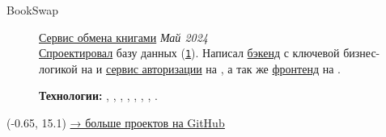 \documentclass[margin,line]{resume}
\begin{document}
\begin{resume}
\begin{description}
      \item[BookSwap]\small{\href{https://github.com/alchemmist/bookswap}{Сервис
          обмена книгами} \hfill
        \textsl{Май 2024\vspace{1mm}}}\\
        \href{https://github.com/alchemmist/bookswap/blob/dev/docs/database.md}{Спроектировал}
        базу данных
        (\href{https://github.com/alchemmist/bookswap/blob/dev/backend/src/main/resources/schema.sql}{\texttt{1}}).
        Написал
        \href{https://github.com/alchemmist/bookswap/tree/dev/backend}{бэкенд}
        с ключевой бизнес-логикой на  и
        \href{https://github.com/alchemmist/bookswap/tree/dev/auth-service}{сервис
        авторизации} на , а так же
        \href{https://github.com/alchemmist/bookswap/tree/dev/frontend}{фронтенд}
        на
        .

        \textbf{Технологии:} ,
        , ,
        , , ,
        , .

    \end{description}
  \end{resume}

  \begin{minipage}[H]{9.18\textwidth}
    \begin{textblock}{7}(-0.65, 15.1)
      \begingroup
      \hspace{35mm}
      \hypersetup{urlcolor=gray!90}
      \large
      \href{https://github.com/alchemmist}{→ больше проектов на
      \underline{GitHub}}
      \endgroup
    \end{textblock}

  \end{minipage}

  \clearpage

  
\end{document}
